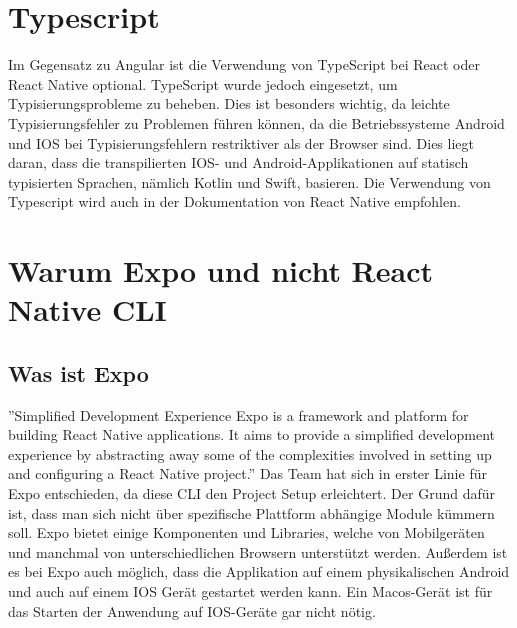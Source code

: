 \section{Typescript}
Im Gegensatz zu Angular ist die Verwendung von TypeScript bei React oder React Native optional. TypeScript wurde jedoch eingesetzt, um Typisierungsprobleme zu beheben. Dies ist besonders wichtig, da leichte Typisierungsfehler zu Problemen führen können, da die Betriebssysteme Android und IOS  bei Typisierungsfehlern restriktiver als der Browser sind. Dies liegt daran, dass die transpilierten IOS- und Android-Applikationen auf statisch typisierten Sprachen, nämlich Kotlin und Swift, basieren.
Die Verwendung von Typescript wird auch  in der Dokumentation von React Native empfohlen. \cite{typescript-with-react-native}


\section{Warum Expo und nicht React Native CLI}

\subsection{Was ist Expo}
''Simplified Development Experience Expo is a framework and platform for building React Native applications. It aims to provide a simplified development experience by abstracting away some of the complexities involved in setting up and configuring a React Native project.''\cite{expo}
Das Team hat sich in erster Linie für Expo entschieden, da diese CLI den Project Setup erleichtert.
Der Grund dafür ist, dass man sich nicht über spezifische Plattform abhängige Module kümmern soll.
Expo bietet einige Komponenten und Libraries, welche von Mobilgeräten und manchmal von unterschiedlichen Browsern unterstützt werden.
Außerdem ist es bei Expo auch möglich,
dass die Applikation auf einem physikalischen Android und auch auf einem IOS Gerät gestartet werden kann.
Ein Macos-Gerät ist für das Starten der Anwendung auf IOS-Geräte gar nicht nötig. \cite{expo}
